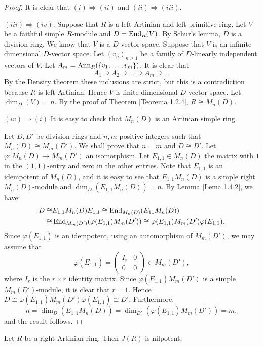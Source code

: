 \begin{proof}
It is clear that $(i)\Rightarrow (ii)$ and $(ii)\Rightarrow (iii)$.

$(iii)\Rightarrow (iv)$. Suppose that $R$ is a left Artinian and left primitive ring. Let $V$ be a faithful simple $R$-module
and $D=\operatorname{End}_R(V)$. By Schur's lemma, $D$ is a division ring.
We know that $V$ is a $D$-vector space.
Suppose that $V$ is an infinite dimensional $D$-vector space. Let $( v_n)_{n\geq 1}$ be a family of 
$D$-linearly independent vectors of $V$. Let $A_m=\operatorname{Ann}_R(\{
v_1,\dots,v_m\} )$. It is clear that
$$A_1\supseteq A_2\supseteq\dots\supseteq A_m\supseteq\dots$$
By the Density theorem these inclusions are strict, but this is a contradiction because $R$ is left Artinian. Hence $V$ 
is finite dimensional $D$-vector space. Let  $\dim_D(V)=n$. By the proof of Theorem \ref{Teorema 1.2.4}, $R\cong M_n(D)$.

$(iv)\Rightarrow (i)$ It is easy to check that $M_n(D)$ is an Artinian simple ring.

Let $D,D'$ be division rings and $n,m$ positive integers such that
$M_n(D)\cong M_m(D')$. We shall prove that $n=m$ and $D\cong D'$. Let
$\varphi\colon M_n(D)\rightarrow M_m(D')$ an isomorphism. Let
$E_{1,1}\in M_n(D)$ the matrix with $1$ in the $(1,1)$-entry and zero in the other entries. Note that $E_{1,1}$ is an idempotent of $M_n(D)$, and it is easy to see that $E_{1,1}M_n(D)$ is a simple right $M_n(D)$-module and $\dim_D(E_{1,1}M_n(D))=n$. By Lemma \ref{Lema 1.4.2}, we have:
\begin{align*} D\cong&
E_{1,1}M_n(D)E_{1,1}\cong\operatorname{End}_{M_n(D)}(E_{11}M_n(D))\\
\cong&
\operatorname{End}_{M_m(D')}(\varphi (E_{1,1})M_m(D'))\cong \varphi
(E_{1,1})M_m(D')\varphi (E_{1,1}).
\end{align*}
Since $\varphi (E_{1,1})$ is an idempotent, using an automorphism of $M_m(D')$, we may assume that
$$\varphi (E_{1,1})=\left(\begin{array}{cc} I_r&0\\
0&0\end{array}\right)\in M_m(D'),$$
where $I_r$ is the $r\times r$ identity  matrix. Since $\varphi
(E_{1,1})M_m(D')$ is a simple $M_m(D')$-module, it is clear that $r=1$. Hence $D\cong \varphi (E_{1,1})M_m(D')\varphi (E_{1,1})\cong D'$.
Furthermore,
$$n=\dim_D(E_{1,1}M_n(D))=\dim_{D'}(\varphi
(E_{1,1})M_m(D'))=m,$$
and the result follows.
\end{proof}

\begin{theorem}\label{Teorema 1.4.4}
Let $R$ be a right Artinian ring. Then $J(R)$ is nilpotent.
\end{theorem}

